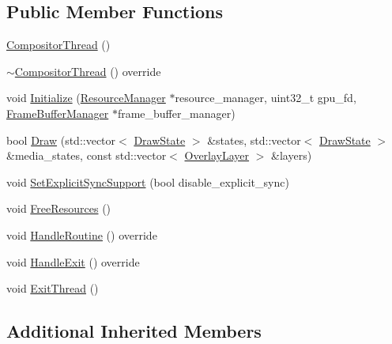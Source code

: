 \subsection*{Public Member Functions}
\begin{DoxyCompactItemize}
\item 
\mbox{\hyperlink{classhwcomposer_1_1CompositorThread_a28f5c6de7aee95706fed421ecf3f2ff5}{Compositor\+Thread}} ()
\item 
\mbox{\hyperlink{classhwcomposer_1_1CompositorThread_aa93b1c77c0d6d55bf30a86cb429724b7}{$\sim$\+Compositor\+Thread}} () override
\item 
void \mbox{\hyperlink{classhwcomposer_1_1CompositorThread_a0e36f2bd6e14959ffd8eff5faeefcbef}{Initialize}} (\mbox{\hyperlink{classhwcomposer_1_1ResourceManager}{Resource\+Manager}} $\ast$resource\+\_\+manager, uint32\+\_\+t gpu\+\_\+fd, \mbox{\hyperlink{classhwcomposer_1_1FrameBufferManager}{Frame\+Buffer\+Manager}} $\ast$frame\+\_\+buffer\+\_\+manager)
\item 
bool \mbox{\hyperlink{classhwcomposer_1_1CompositorThread_a16c0227a122423a7f83a8369f600923b}{Draw}} (std\+::vector$<$ \mbox{\hyperlink{structhwcomposer_1_1DrawState}{Draw\+State}} $>$ \&states, std\+::vector$<$ \mbox{\hyperlink{structhwcomposer_1_1DrawState}{Draw\+State}} $>$ \&media\+\_\+states, const std\+::vector$<$ \mbox{\hyperlink{structhwcomposer_1_1OverlayLayer}{Overlay\+Layer}} $>$ \&layers)
\item 
void \mbox{\hyperlink{classhwcomposer_1_1CompositorThread_a9a304d478866ab7518765ce632eca964}{Set\+Explicit\+Sync\+Support}} (bool disable\+\_\+explicit\+\_\+sync)
\item 
void \mbox{\hyperlink{classhwcomposer_1_1CompositorThread_af48eb5b73445e424b74c7e9375bf8f7c}{Free\+Resources}} ()
\item 
void \mbox{\hyperlink{classhwcomposer_1_1CompositorThread_af80e4eb7864b2f83a1eaa266a17b3a28}{Handle\+Routine}} () override
\item 
void \mbox{\hyperlink{classhwcomposer_1_1CompositorThread_a15f97ae71050432ba2780555368a3fca}{Handle\+Exit}} () override
\item 
void \mbox{\hyperlink{classhwcomposer_1_1CompositorThread_a700ec2d3412ae4a3cbc5742c6003e660}{Exit\+Thread}} ()
\end{DoxyCompactItemize}
\subsection*{Additional Inherited Members}


